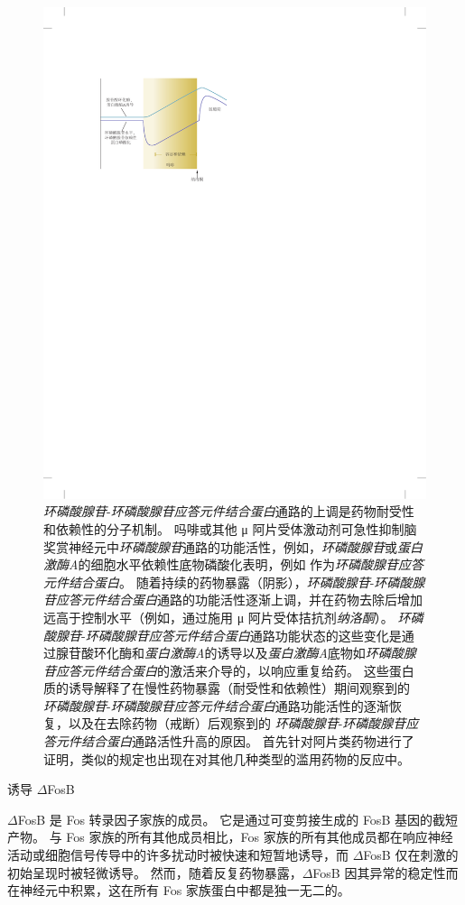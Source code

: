 \begin{figure}[htbp]
	\centering
	\includegraphics[width=0.55\linewidth]{chap43/fig_43_5}
	\caption{\textit{环磷酸腺苷}-\textit{环磷酸腺苷应答元件结合蛋白}通路的上调是药物耐受性和依赖性的分子机制。
		吗啡或其他 μ 阿片受体激动剂可急性抑制脑奖赏神经元中\textit{环磷酸腺苷}通路的功能活性，例如，\textit{环磷酸腺苷}或\textit{蛋白激酶A}的细胞水平依赖性底物磷酸化表明，例如 作为\textit{环磷酸腺苷应答元件结合蛋白}。
		随着持续的药物暴露（阴影），\textit{环磷酸腺苷}-\textit{环磷酸腺苷应答元件结合蛋白}通路的功能活性逐渐上调，并在药物去除后增加远高于控制水平（例如，通过施用 μ 阿片受体拮抗剂\textit{纳洛酮}）。 \textit{环磷酸腺苷}-\textit{环磷酸腺苷应答元件结合蛋白}通路功能状态的这些变化是通过腺苷酸环化酶和\textit{蛋白激酶A}的诱导以及\textit{蛋白激酶A}底物如\textit{环磷酸腺苷应答元件结合蛋白}的激活来介导的，以响应重复给药。
		这些蛋白质的诱导解释了在慢性药物暴露（耐受性和依赖性）期间观察到的 \textit{环磷酸腺苷}-\textit{环磷酸腺苷应答元件结合蛋白}通路功能活性的逐渐恢复，以及在去除药物（戒断）后观察到的 \textit{环磷酸腺苷}-\textit{环磷酸腺苷应答元件结合蛋白}通路活性升高的原因。
		首先针对阿片类药物进行了证明，类似的规定也出现在对其他几种类型的滥用药物的反应中\cite{trimble2002molecular}。}
	\label{fig:43_5}
\end{figure}


诱导 $\Delta$FosB

$\Delta$FosB 是 Fos 转录因子家族的成员。
它是通过可变剪接生成的 FosB 基因的截短产物。
与 Fos 家族的所有其他成员相比，Fos 家族的所有其他成员都在响应神经活动或细胞信号传导中的许多扰动时被快速和短暂地诱导，而 $\Delta$FosB 仅在刺激的初始呈现时被轻微诱导。
然而，随着反复药物暴露，$\Delta$FosB 因其异常的稳定性而在神经元中积累，这在所有 Fos 家族蛋白中都是独一无二的。


